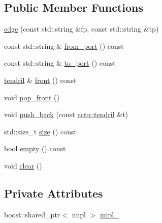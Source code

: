 \subsection*{Public Member Functions}
\begin{DoxyCompactItemize}
\item 
\hyperlink{structecto_1_1graph_1_1edge_a8006b69871f55450b8acec6ac05762d4}{edge} (const std\-::string \&fp, const std\-::string \&tp)
\item 
const std\-::string \& \hyperlink{structecto_1_1graph_1_1edge_a2fb1c33fc4d337b719a1666eab943da5}{from\-\_\-port} () const 
\item 
const std\-::string \& \hyperlink{structecto_1_1graph_1_1edge_ab1c782c9d14a3f58504783747e14f7e0}{to\-\_\-port} () const 
\item 
\hyperlink{classecto_1_1tendril}{tendril} \& \hyperlink{structecto_1_1graph_1_1edge_ac2cd2d873aa55199e44f836ffada307e}{front} () const 
\item 
void \hyperlink{structecto_1_1graph_1_1edge_a0b530770694143bc00bc6c563b64a3c9}{pop\-\_\-front} ()
\item 
void \hyperlink{structecto_1_1graph_1_1edge_a257de20468c8c1b6c606448ba39c493c}{push\-\_\-back} (const \hyperlink{classecto_1_1tendril}{ecto\-::tendril} \&t)
\item 
std\-::size\-\_\-t \hyperlink{structecto_1_1graph_1_1edge_a539c89ca50c781c95ece29f7cade4d1d}{size} () const 
\item 
bool \hyperlink{structecto_1_1graph_1_1edge_ab8857a18a55e6d230e84a2a07242d67e}{empty} () const 
\item 
void \hyperlink{structecto_1_1graph_1_1edge_a2761342510ae1bedb1c91bbbda5f46ef}{clear} ()
\end{DoxyCompactItemize}
\subsection*{Private Attributes}
\begin{DoxyCompactItemize}
\item 
boost\-::shared\-\_\-ptr$<$ impl $>$ \hyperlink{structecto_1_1graph_1_1edge_a88b7d991f162cd009884c3061da8169d}{impl\-\_\-}
\end{DoxyCompactItemize}


